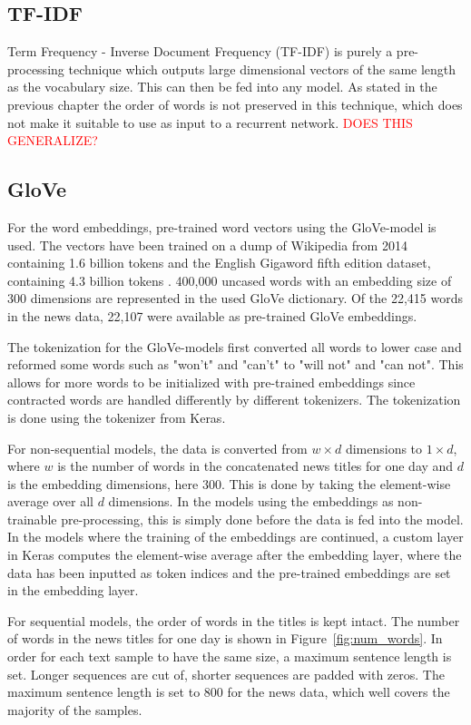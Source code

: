 \subsection{TF-IDF}

Term Frequency - Inverse Document Frequency (TF-IDF) is purely a pre-processing technique which outputs large dimensional vectors of the same length as the vocabulary size. This can then be fed into any model. As stated in the previous chapter the order of words is not preserved in this technique, which does not make it suitable to use as input to a recurrent network. \textcolor{red}{DOES THIS GENERALIZE?}

\subsection{GloVe}

For the word embeddings, pre-trained word vectors using the GloVe-model is used. The vectors have been trained on a dump of Wikipedia from 2014 containing 1.6 billion tokens and the English Gigaword fifth edition dataset, containing 4.3 billion tokens \citep{pennington2014glove}. 400,000 uncased words with an embedding size of 300 dimensions are represented in the used GloVe dictionary. Of the 22,415 words in the news data, 22,107 were available as pre-trained GloVe embeddings. 

The tokenization for the GloVe-models first converted all words to lower case and reformed some words such as "won't" and "can't" to "will not" and "can not". This allows for more words to be initialized with pre-trained embeddings since contracted words are handled differently by different tokenizers. The tokenization is done using the tokenizer from Keras.  

For non-sequential models, the data is converted from $w \times d$ dimensions to $1 \times d$, where $w$ is the number of words in the concatenated news titles for one day and $d$ is the embedding dimensions, here 300. This is done by taking the element-wise average over all $d$ dimensions. In the models using the embeddings as non-trainable pre-processing, this is simply done before the data is fed into the model. In the models where the training of the embeddings are continued, a custom layer in Keras computes the element-wise average after the embedding layer, where the data has been inputted as token indices and the pre-trained embeddings are set in the embedding layer.

For sequential models, the order of words in the titles is kept intact. The number of words in the news titles for one day is shown in Figure~\ref{fig:num_words}. In order for each text sample to have the same size, a maximum sentence length is set. Longer sequences are cut of, shorter sequences are padded with zeros. The maximum sentence length is set to 800 for the news data, which well covers the majority of the samples. 

